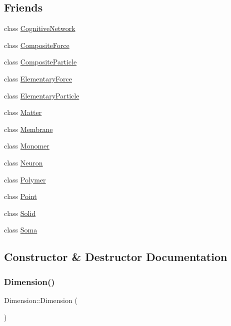 \subsection*{Friends}
\begin{DoxyCompactItemize}
\item 
class \mbox{\hyperlink{classDimension_ad04bbaef84caa0d408ec09a1c1302f5f}{Cognitive\+Network}}
\item 
class \mbox{\hyperlink{classDimension_a1dacbeca8e464bdc533a40a1b18f33b2}{Composite\+Force}}
\item 
class \mbox{\hyperlink{classDimension_a8be5cf46db5f9876c49d58e4ab84044b}{Composite\+Particle}}
\item 
class \mbox{\hyperlink{classDimension_a6e57500586e9cd366f5cf76ea0299957}{Elementary\+Force}}
\item 
class \mbox{\hyperlink{classDimension_af2ace341c1d7ccd30de3502502773591}{Elementary\+Particle}}
\item 
class \mbox{\hyperlink{classDimension_a01ab5ef28c10ff1c9ed0c618fa044aea}{Matter}}
\item 
class \mbox{\hyperlink{classDimension_ac790db405644a01723104c3c0c8128bb}{Membrane}}
\item 
class \mbox{\hyperlink{classDimension_a9175d4e959674956ccb487d060bac93f}{Monomer}}
\item 
class \mbox{\hyperlink{classDimension_aa410d74ba34b18a9f6bdf24323c4ee5b}{Neuron}}
\item 
class \mbox{\hyperlink{classDimension_ae64ddc1700c5abc4106cbcc5843a4a42}{Polymer}}
\item 
class \mbox{\hyperlink{classDimension_aa238d52f825b8ea8da6a5c4ae1b8d482}{Point}}
\item 
class \mbox{\hyperlink{classDimension_a5636b9113fd1246b3392dd52b3138229}{Solid}}
\item 
class \mbox{\hyperlink{classDimension_aaa07b7b364b620b9a781f30a5cd9f5ea}{Soma}}
\end{DoxyCompactItemize}


\subsection{Constructor \& Destructor Documentation}
\mbox{\label{classDimension_aa61dad15f33b6c3d09028ba9e545aa70}} 
\subsubsection{\texorpdfstring{Dimension()}{Dimension()}\hspace{0.1cm}{\footnotesize\ttfamily [1/4]}}
{\footnotesize\ttfamily Dimension\+::\+Dimension (\begin{DoxyParamCaption}{ }\end{DoxyParamCaption})\hspace{0.3cm}{\ttfamily [inline]}}

